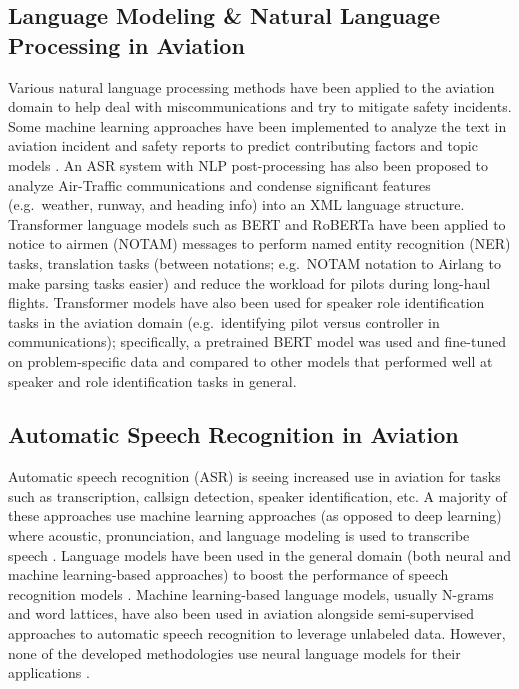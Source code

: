 \documentclass[12pt]{article}
\begin{document}
\subsection{Language Modeling \& Natural Language Processing in Aviation}
Various natural language processing methods have been applied to the aviation domain to help deal with miscommunications and try to mitigate safety
incidents\cite{ragnarsdottir_language_2003,tanguy_natural_2016,madeira_machine_2021}. Some machine learning approaches have been implemented to
analyze the text in aviation incident and safety reports to predict contributing factors and topic models
\cite{tanguy_natural_2016,madeira_machine_2021}. An ASR system with NLP post-processing has also been proposed to analyze Air-Traffic communications
and condense significant features (e.g.~weather, runway, and heading info) into an XML language structure\cite{ragnarsdottir_language_2003}.
Transformer language models such as BERT and RoBERTa have been applied to notice to airmen (NOTAM) messages to perform named entity recognition (NER)
tasks, translation tasks (between notations; e.g.~NOTAM notation to Airlang to make parsing tasks easier) and reduce the workload for pilots during
long-haul flights\cite{arnold_knowledge_2022}. Transformer models have also been used for speaker role identification tasks in the aviation domain
(e.g.~identifying pilot versus controller in communications); specifically, a pretrained BERT model was used and fine-tuned on problem-specific data
and compared to other models that performed well at speaker and role identification tasks in general\cite{guo_comparative_2022}.

\subsection{Automatic Speech Recognition in Aviation}
Automatic speech recognition (ASR) is seeing increased use in aviation for tasks such as transcription, callsign detection, speaker identification, etc. A
majority of these approaches use machine learning approaches (as opposed to deep learning) where acoustic, pronunciation, and language modeling is
used to transcribe speech
\cite{guo_comparative_2022,smidl_air_2019,zuluaga-gomez_automatic_2020,badrinath_automatic_2022,hofbauer_atcosim_2008,helmke_quantifying_2017}.
Language models have been used in the general domain (both neural and machine learning-based approaches) to boost the performance of speech
recognition models \cite{han_contextnet_2020,kriman_quartznet_2020,majumdar_citrinet_2021}. Machine learning-based language models, usually N-grams
and word lattices, have also been used in aviation alongside semi-supervised approaches to automatic speech recognition to leverage unlabeled data.
However, none of the developed methodologies use neural language models for their applications
\cite{zuluaga-gomez_contextual_2021,srinivasamurthy_semi-supervised_2017,badrinath_automatic_2022}.
\end{document}
